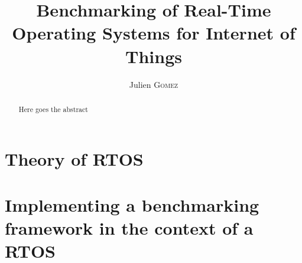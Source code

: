 \documentclass{EPL-master-thesis-covers-EN}
\title{Benchmarking of Real-Time Operating Systems for Internet of Things}
\author{Julien \textsc{Gomez}}
\begin{document}
  \maketitle


 \begin{abstract}
    Here goes the abstract
 \end{abstract}

{\hypersetup{hidelinks=true}
\tableofcontents
}



\part{Theory of RTOS}




\part{Implementing a benchmarking framework in the context of a RTOS}






\listoffigures
\listoftables


\backcoverpage
\end{document}
